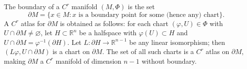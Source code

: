 The boundary of a $C^r$ manifold $(M, \Phi)$ is the set
$$\partial M = \{x \in M : x \text{ is a boundary point for some (hence any) chart}\}.$$
A $C^r$ atlas for $\partial M$ is obtained as follows: for each chart $(\varphi, U) \in \Phi$ with $U \cap \partial M \neq \varnothing$, let $H \subset \mathbb{R}^n$ be a halfspace with $\varphi(U) \subset H$ and $U \cap \partial M = \varphi^{-1}(\partial H)$. Let $L: \partial H \to \mathbb{R}^{n-1}$ be any linear isomorphism; then $(L\varphi, U \cap \partial M)$ is a chart on $\partial M$. The set of all such charts is a $C^r$ atlas on $\partial M$, making $\partial M$ a $C^r$ manifold of dimension $n-1$ without boundary.
